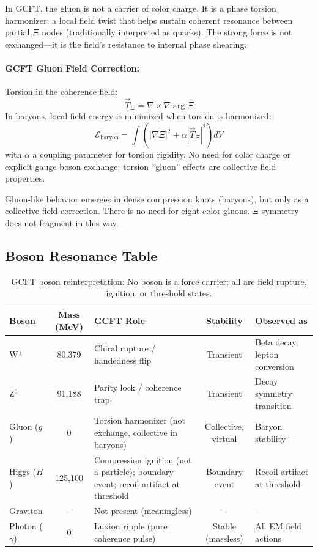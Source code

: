 In GCFT, the gluon is not a carrier of color charge. It is a phase torsion harmonizer: a local field twist that helps sustain coherent resonance between partial $\Xi$ nodes (traditionally interpreted as quarks). The strong force is not exchanged—it is the field's resistance to internal phase shearing.

\paragraph{GCFT Gluon Field Correction:}
Torsion in the coherence field:
\[
\vec{T}_\Xi = \nabla \times \nabla\arg\Xi
\]
In baryons, local field energy is minimized when torsion is harmonized:
\[
\mathcal{E}_{\text{baryon}} = \int \left( |\nabla\Xi|^2 + \alpha |\vec{T}_\Xi|^2 \right) dV
\]
with $\alpha$ a coupling parameter for torsion rigidity. No need for color charge or explicit gauge boson exchange; torsion “gluon” effects are collective field properties.

Gluon-like behavior emerges in dense compression knots (baryons), but only as a collective field correction. There is no need for eight color gluons. $\Xi$ symmetry does not fragment in this way.

\subsection{Boson Resonance Table}


\begin{table}[H]
\footnotesize
\centering
\begin{tabular}[t]{l c >{\raggedright\arraybackslash}p{3.5cm} c >{\raggedright\arraybackslash}p{3.5cm}}
\hline
\textbf{Boson} & \textbf{Mass (MeV)} & \textbf{GCFT Role} & \textbf{Stability} & \textbf{Observed as} \\
\hline
W$^\pm$    & 80,379   & Chiral rupture / handedness flip & Transient & Beta decay, lepton conversion \\
Z$^0$      & 91,188   & Parity lock / coherence trap     & Transient & Decay symmetry transition \\
Gluon ($g$)& 0        & Torsion harmonizer (not exchange, collective in baryons) & Collective, virtual & Baryon stability \\
Higgs ($H$)& 125,100  & Compression ignition (not a particle); boundary event; recoil artifact at threshold & Boundary event & Recoil artifact at threshold \\
Graviton   & --       & Not present (meaningless) & -- & -- \\
Photon ($\gamma$) & 0 & Luxion ripple (pure coherence pulse) & Stable (massless) & All EM field actions \\
\hline
\end{tabular}
\caption{GCFT boson reinterpretation: No boson is a force carrier; all are field rupture, ignition, or threshold states.}
\label{tab:boson_resonance_gcft}
\end{table}

